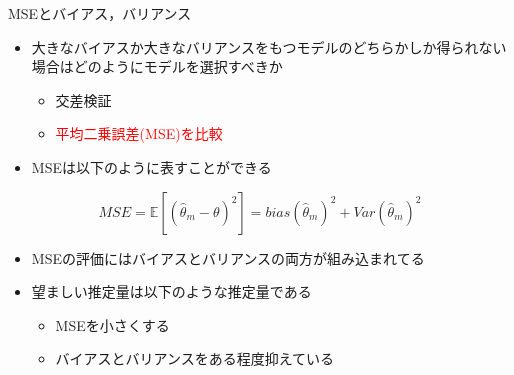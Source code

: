 \documentclass[dvipdfmx, 10pt]{beamer}
\begin{document}
\begin{frame}{MSEとバイアス，バリアンス}
  \begin{itemize}
    \item 大きなバイアスか大きなバリアンスをもつモデルのどちらかしか得られない場合はどのようにモデルを選択すべきか
    \begin{itemize}
      \item 交差検証
      \item \textcolor{red}{平均二乗誤差(MSE)を比較}
    \end{itemize}
    \item MSEは以下のように表すことができる
  \end{itemize}
  \begin{equation}
    MSE = \mathbb{E}[(\hat{\theta}_{m} - \theta)^{2}] = bias(\hat{\theta}_{m})^{2} + Var(\hat{\theta}_{m})^{2}
  \end{equation}
  \begin{itemize}
    \item MSEの評価にはバイアスとバリアンスの両方が組み込まれてる
    \item 望ましい推定量は以下のような推定量である
    \begin{itemize}
      \item MSEを小さくする
      \item バイアスとバリアンスをある程度抑えている
    \end{itemize}
  \end{itemize}
\end{frame}

\end{document}
